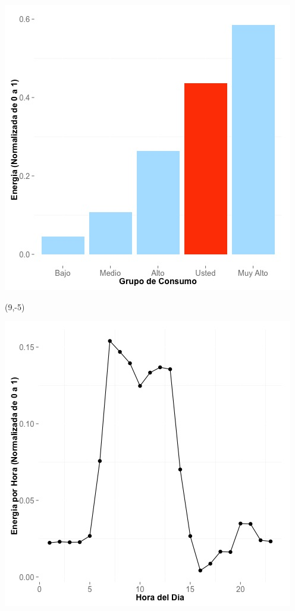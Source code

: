 \documentclass{article}\usepackage[]{graphicx}\usepackage[]{color}
\newenvironment{knitrout}{}{} %
\begin{document}
\begin{knitrout}
\color{fgcolor}
\includegraphics[scale=0.65]{figure/A10_neighbor_plot} 
\end{knitrout}

 \begin{textblock}{1}(9,-5)
\begin{minipage}{20em}
\begingroup

\endgroup
\end{minipage}
\end{textblock}


\begin{knitrout}
\color{fgcolor}
\includegraphics[scale=0.65]{figure/A10_plot_norm_median} 
\end{knitrout}
\end{document}
